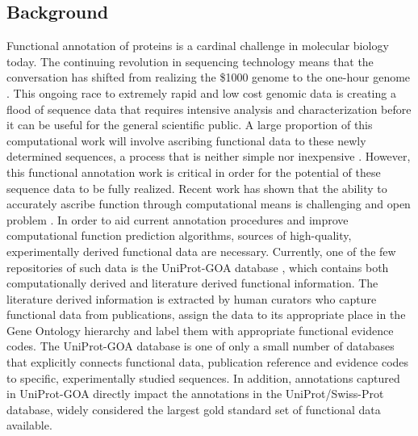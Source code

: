 \documentclass[10pt]{bmc_article}
\newenvironment{bmcformat}{\begin{raggedright}\baselineskip20pt\sloppy\setboolean{publ}{false}}{\end{raggedright}\baselineskip20pt\sloppy}
\begin{document}
\begin{bmcformat}
\section*{Background}
Functional annotation of proteins is a cardinal challenge in molecular biology today. The continuing revolution in sequencing technology means that the conversation has shifted from realizing the \$1000 genome to the one-hour genome  \cite{PMID 22443932}. This ongoing race to extremely rapid and low cost genomic data is creating a flood of sequence data that requires intensive analysis and characterization before it can be useful for the general scientific public. A large proportion of this computational work will involve ascribing functional data to these newly determined sequences, a process that is neither simple nor inexpensive \cite{gerstein paper PMID 21867570}. However, this functional annotation work is critical in order for the potential of these sequence data to be fully realized. Recent work has shown that  the ability to accurately ascribe function through computational means is challenging and open problem \cite{schnoes paper? cafa paper?}. In order to aid current annotation procedures and improve computational function prediction algorithms, sources of high-quality, experimentally derived functional data are necessary. Currently, one of the few repositories of such data is the UniProt-GOA database \cite{U-GOA ref}, which contains both computationally derived and literature derived functional information. The literature derived information is extracted by human curators who  capture functional data from publications, assign the data to its appropriate place in the Gene Ontology hierarchy \cite{GO ref} and label them with appropriate functional evidence codes. The UniProt-GOA database is one of only a small number of databases that explicitly connects functional data, publication reference and evidence codes to specific, experimentally studied sequences. In addition, annotations captured in UniProt-GOA directly impact the annotations in the UniProt/Swiss-Prot database, widely considered the largest gold standard set of functional data \cite{swissprot ref} available. 


\end{bmcformat}
\end{document}
